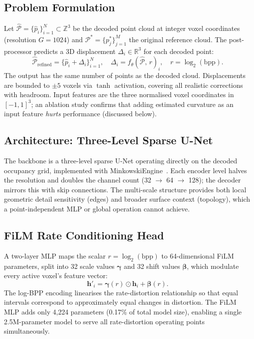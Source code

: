 \subsection*{Problem Formulation}

Let $\hat{\mathcal{P}} = \{\hat{p}_i\}_{i=1}^{N} \subset \mathbb{Z}^3$ be
the decoded point cloud at integer voxel coordinates (resolution $G=1024$)
and $\mathcal{P}^* = \{p^*_j\}_{j=1}^{M}$ the original reference cloud.
The post-processor predicts a 3D displacement $\Delta_i \in \mathbb{R}^3$
for each decoded point:
\[
  \hat{\mathcal{P}}_{\mathrm{refined}}
    = \bigl\{\hat{p}_i + \Delta_i\bigr\}_{i=1}^{N},
  \quad
  \Delta_i = f_\theta(\hat{\mathcal{P}},\,r)_i,
  \quad r = \log_2(\mathrm{bpp}).
\]
The output has the same number of points as the decoded cloud.
Displacements are bounded to ${\pm}5$ voxels via $\tanh$ activation, covering
all realistic corrections with headroom.
Input features are the three normalised voxel coordinates in $[-1,1]^3$;
an ablation study confirms that adding estimated curvature as an input feature
\emph{hurts} performance (discussed below).

\subsection*{Architecture: Three-Level Sparse U-Net}

The backbone is a three-level sparse U-Net operating directly on the decoded
occupancy grid, implemented with MinkowskiEngine~\cite{choy2019minkowski}.
Each encoder level halves the resolution and doubles the channel count
(32 $\to$ 64 $\to$ 128); the decoder mirrors this with skip connections.
The multi-scale structure provides both local geometric detail sensitivity
(edges) and broader surface context (topology), which a point-independent MLP
or global operation cannot achieve.

\subsection*{FiLM Rate Conditioning Head}

A two-layer MLP maps the scalar $r = \log_2(\mathrm{bpp})$ to 64-dimensional
FiLM parameters, split into 32 scale values $\boldsymbol{\gamma}$ and 32 shift
values $\boldsymbol{\beta}$, which modulate every active voxel's feature vector:
\[
  \mathbf{h}'_i = \boldsymbol{\gamma}(r) \odot \mathbf{h}_i + \boldsymbol{\beta}(r).
\]
The log-BPP encoding linearises the rate-distortion relationship so that equal
intervals correspond to approximately equal changes in distortion.
The FiLM MLP adds only 4,224 parameters (0.17\% of total model size),
enabling a single 2.5M-parameter model to serve all rate-distortion operating
points simultaneously.


